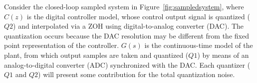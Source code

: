 \documentclass{sig-alternate-05-2015}
\begin{document}
Consider the closed-loop sampled system in Figure~\ref{fig:sampledsystem},
where $C(z)$ is the digital controller model, whose control output signal is
quantized ($Q2$) and interpolated via a ZOH using digital-to-analog
converter (DAC).  The quantization occurs because the DAC resolution may be
different from the fixed point representation of the controller.  $G(s)$ is
the continuous-time model of the plant, from which output samples are taken
and quantized ($Q1$) by means of an analog-to-digital converter (ADC)
synchronized with the DAC.  Each quantizer ($Q1$ and $Q2$) will present some
contribution for the total quantization noise.
%    
%
%
%
%     
\end{document}
